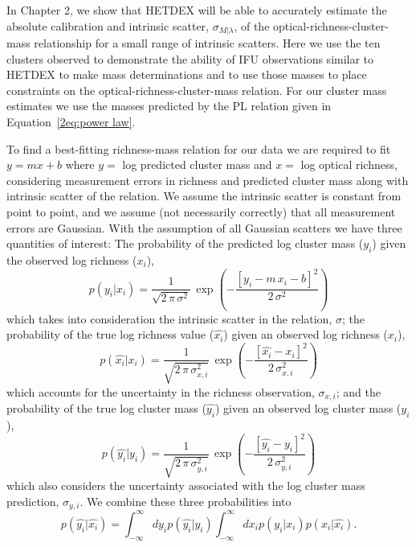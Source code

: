 In Chapter 2, we show that HETDEX will be able to accurately estimate the absolute calibration and intrinsic scatter, $\sigma_{M|\lambda}$, of the optical-richness-cluster-mass relationship for a small range of intrinsic scatters. Here we use the ten clusters observed to demonstrate the ability of IFU observations similar to HETDEX to make mass determinations and to use those masses to place constraints on the optical-richness-cluster-mass relation. For our cluster mass estimates we use the masses predicted by the PL relation given in Equation~\ref{2eq:power law}. 

To find a best-fitting richness-mass relation for our data we are required to fit $y=mx+b$ where $y =$ log predicted cluster mass and $x =$ log optical richness, considering measurement errors in richness and predicted cluster mass along with intrinsic scatter of the relation. We assume the intrinsic scatter is constant from point to point, and we assume (not necessarily correctly) that all measurement errors are Gaussian. With the assumption of all Gaussian scatters we have three quantities of interest:
The probability of the predicted log cluster mass ($y_i$) given the observed log richness ($x_i$),
\begin{equation}\label{2eqn:intrinsic scatter}
	p(y_i|x_i) = \frac{1}{\sqrt{2\,\pi\,\sigma^2}}
	 \,\exp\left(-\frac{[y_i - m\,x_i - b]^2}{2\,\sigma^2}\right)
\end{equation}
which takes into consideration the intrinsic scatter in the relation, $\sigma$; the probability of the true log richness value ($\hat{x_i}$) given an observed log richness ($x_i$),
\begin{equation}\label{2eqn:xerr}
	p(\hat{x_i}|x_i) = \frac{1}{\sqrt{2\,\pi\,\sigma_{x,i}^2}}
	 \,\exp\left(-\frac{[\hat{x_i} - x_i]^2}{2\,\sigma_{x,i}^2}\right)
\end{equation}
which accounts for the uncertainty in the richness observation, $\sigma_{x,i}$; and the probability of the true log cluster mass ($\hat{y_i}$) given an observed log cluster mass ($y_i$),
\begin{equation}\label{2eqn:yerr}
	p(\hat{y_i}|y_i) = \frac{1}{\sqrt{2\,\pi\,\sigma_{y,i}^2}}
	 \,\exp\left(-\frac{[\hat{y_i} -y_i]^2}{2\,\sigma_{y,i}^2}\right)
\end{equation}
which also considers the uncertainty associated with the log cluster mass prediction, $\sigma_{y,i}$. We combine these three probabilities into
\begin{equation}
	p(\hat{y_i}|\hat{x_i}) = \int_{-\infty}^\infty dy_ip(\hat{y_i}|y_i) \int_{-\infty}^\infty dx_ip(y_i|x_i)p(x_i|\hat{x_i}).
\end{equation}
